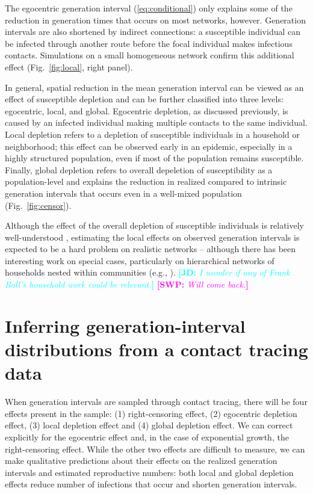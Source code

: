 \documentclass[12pt]{article}
\newcommand{\eref}[1]{(\ref{eq:#1})}
\newcommand{\fref}[1]{Fig.~\ref{fig:#1}}
\newcommand{\comment}[3]{\textcolor{#1}{\textbf{[#2: }\textsl{#3}\textbf{]}}}
\newcommand{\jd}[1]{\comment{cyan}{JD}{#1}}
\newcommand{\swp}[1]{\comment{magenta}{SWP}{#1}}
\begin{document}
The egocentric generation interval \eref{conditional} only explains some of the reduction in generation times that occurs on most networks, however.
Generation intervals are also shortened by indirect connections: a susceptible individual can be infected through another route before the focal individual makes infectious contacts.
Simulations on a small homogeneous network confirm this additional effect (\fref{local}, right panel). 

In general, spatial reduction in the mean generation interval can be viewed as an effect of susceptible depletion and can be further classified into three levels: egocentric, local, and global.
Egocentric depletion, as discussed previously, is caused by an infected individual making multiple contacts to the same individual.
Local depletion refers to a depletion of susceptible individuals in a household or neighborhood;
this effect can be observed early in an epidemic, especially in a highly structured population, even if most of the population remains susceptible.
Finally, global depletion refers to overall depeletion of susceptibility as a population-level and explains the reduction in realized compared to intrinsic generation intervals that occurs even in a well-mixed population (\fref{censor}). 

Although the effect of the overall depletion of susceptible individuals is relatively well-understood \citep{champredon2015intrinsic}, estimating the local effects on observed generation intervals is expected to be a hard problem on realistic networks -- although there has been interesting work on special cases, particularly on hierarchical networks of households nested within communities (e.g.,  \cite{tomba2010some}). \jd{I wonder if any of Frank Ball's household work could be relevant.}
\swp{Will come back.}

\section{Inferring generation-interval distributions from a contact tracing data}

When generation intervals are sampled through contact tracing, there will be four effects present in the sample: (1) right-censoring effect, (2) egocentric depletion effect, (3) local depletion effect and (4) global depletion effect.
We can correct explicitly for the egocentric effect and, in the case of exponential growth, the right-censoring effect.
While the other two effects are difficult to measure, we can make qualitative predictions about their effects on the realized generation intervals and estimated reproductive numbers: 
both local and global depletion effects reduce number of infections that occur and shorten generation intervals.
\end{document}
